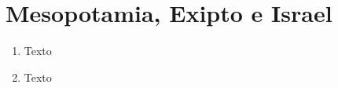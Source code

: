 % 
%



\section{Mesopotamia, Exipto e Israel} \label{sec:mesopotamia-exipto-israel}

\begin{ejercicio}[Mesopotamia]
 \begin{enumerate}[1)]
  \item 
    Texto \dotfill
  \item
    Texto \dotfill    
 \end{enumerate}
\end{ejercicio}
%
